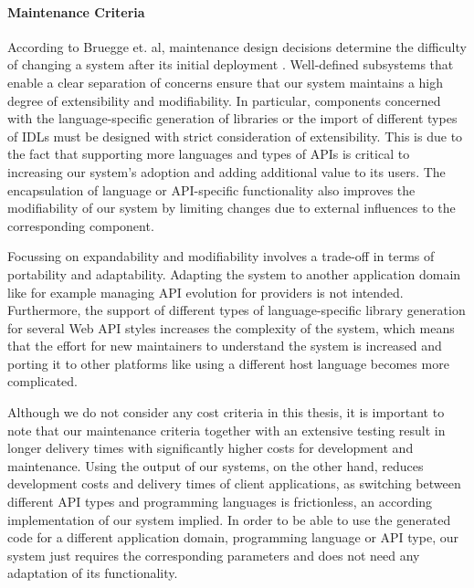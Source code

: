 \paragraph{Maintenance Criteria}
According to Bruegge et. al, maintenance design decisions determine the difficulty of changing a system after its initial deployment \cite{bruegge_object-oriented_2010}. Well-defined subsystems that enable a clear separation of concerns ensure that our system maintains a high degree of extensibility and modifiability. In particular, components concerned with the language-specific generation of libraries or the import of different types of IDLs must be designed with strict consideration of extensibility. This is due to the fact that supporting more languages and types of APIs is critical to increasing our system's adoption and adding additional value to its users. The encapsulation of language or API-specific functionality also improves the modifiability of our system by limiting changes due to external influences to the corresponding component. 

Focussing on expandability and modifiability involves a trade-off in terms of portability and adaptability. Adapting the system to another application domain like for example managing API evolution for providers is not intended. Furthermore, the support of different types of language-specific library generation for several Web API styles increases the complexity of the system, which means that the effort for new maintainers to understand the system is increased and porting it to other platforms like using a different host language becomes more complicated. 

Although we do not consider any cost criteria in this thesis, it is important to note that our maintenance criteria together with an extensive testing result in longer delivery times with significantly higher costs for development and maintenance. Using the output of our systems, on the other hand, reduces development costs and delivery times of client applications, as switching between different API types and programming languages is frictionless, an according implementation of our system implied. In order to be able to use the generated code for a different application domain, programming language or API type, our system just requires the corresponding parameters and does not need any adaptation of its functionality.

